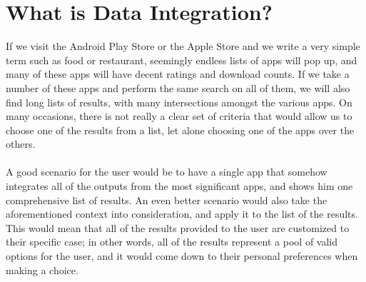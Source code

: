 \section{What is Data Integration?}
\label{sec:integration}
If we visit the Android Play Store or the Apple Store and we write a very simple term such as food or restaurant, seemingly endless lists of apps will pop up, and many of these apps will have decent ratings and download counts. If we take a number of these apps and perform the same search on all of them, we will also find long lists of results, with many intersections amongst the various apps. On many occasions, there is not really a clear set of criteria that would allow us to choose one of the results from a list, let alone choosing one of the apps over the others.\\\\
A good scenario for the user would be to have a single app that somehow integrates all of the outputs from the most significant apps, and shows him one comprehensive list of results. An even better scenario would also take the aforementioned context into consideration, and apply it to the list of the results. This would mean that all of the results provided to the user are customized to their specific case; in other words, all of the results represent a pool of valid options for the user, and it would come down to their personal preferences when making a choice.

